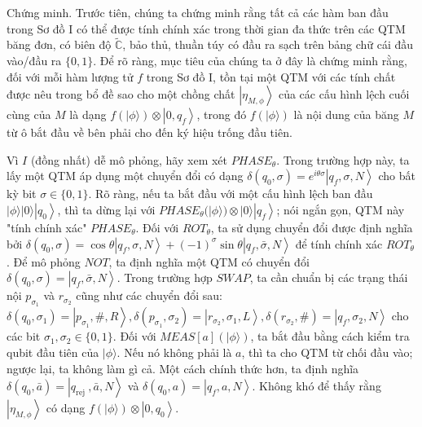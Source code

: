 \documentclass[10pt]{article}
\begin{document}
Chứng minh. Trước tiên, chúng ta chứng minh rằng tất cả các hàm ban đầu trong Sơ đồ I có thể được tính chính xác trong thời gian đa thức trên các QTM băng đơn, có biên độ $\tilde{\mathbb{C}}$, bảo thủ, thuần túy có đầu ra sạch trên bảng chữ cái đầu vào/đầu ra $\{0,1\}$. Để rõ ràng, mục tiêu của chúng ta ở đây là chứng minh rằng, đối với mỗi hàm lượng tử $f$ trong Sơ đồ I, tồn tại một QTM với các tính chất được nêu trong bổ đề sao cho một chồng chất $\left|\eta_{M, \phi}\right\rangle$ của các cấu hình lệch cuối cùng của $M$ là dạng $f(|\phi\rangle) \otimes\left|0, q_{f}\right\rangle$, trong đó $f(|\phi\rangle)$ là nội dung của băng $M$ từ ô bắt đầu về bên phải cho đến ký hiệu trống đầu tiên.

Vì $I$ (đồng nhất) dễ mô phỏng, hãy xem xét $P H A S E_{\theta}$. Trong trường hợp này, ta lấy một QTM áp dụng một chuyển đổi có dạng $\delta\left(q_{0}, \sigma\right)=e^{i \theta \sigma}\left|q_{f}, \sigma, N\right\rangle$ cho bất kỳ bit $\sigma \in\{0,1\}$. Rõ ràng, nếu ta bắt đầu với một cấu hình lệch ban đầu $|\phi\rangle|0\rangle\left|q_{0}\right\rangle$, thì ta dừng lại với $P H A S E_{\theta}(|\phi\rangle) \otimes|0\rangle\left|q_{f}\right\rangle$; nói ngắn gọn, QTM này "tính chính xác" $P H A S E_{\theta}$. Đối với $R O T_{\theta}$, ta sử dụng chuyển đổi được định nghĩa bởi $\delta\left(q_{0}, \sigma\right)=\cos \theta\left|q_{f}, \sigma, N\right\rangle+(-1)^{\sigma} \sin \theta\left|q_{f}, \bar{\sigma}, N\right\rangle$ để tính chính xác $R O T_{\theta}$. Để mô phỏng $N O T$, ta định nghĩa một QTM có chuyển đổi $\delta\left(q_{0}, \sigma\right)=\left|q_{f}, \bar{\sigma}, N\right\rangle$. Trong trường hợp $S W A P$, ta cần chuẩn bị các trạng thái nội $p_{\sigma_{1}}$ và $r_{\sigma_{2}}$ cũng như các chuyển đổi sau: $\delta\left(q_{0}, \sigma_{1}\right)=\left|p_{\sigma_{1}}, \#, R\right\rangle, \delta\left(p_{\sigma_{1}}, \sigma_{2}\right)=\left|r_{\sigma_{2}}, \sigma_{1}, L\right\rangle, \delta\left(r_{\sigma_{2}}, \#\right)=\left|q_{f}, \sigma_{2}, N\right\rangle$ cho các bit $\sigma_{1}, \sigma_{2} \in\{0,1\}$. Đối với $M E A S[a](|\phi\rangle)$, ta bắt đầu bằng cách kiểm tra qubit đầu tiên của $|\phi\rangle$. Nếu nó không phải là $a$, thì ta cho QTM từ chối đầu vào; ngược lại, ta không làm gì cả. Một cách chính thức hơn, ta định nghĩa $\delta\left(q_{0}, \bar{a}\right)=\left|q_{\text {rej }}, \bar{a}, N\right\rangle$ và $\delta\left(q_{0}, a\right)=\left|q_{f}, a, N\right\rangle$. Không khó để thấy rằng $\left|\eta_{M, \phi}\right\rangle$ có dạng $f(|\phi\rangle) \otimes\left|0, q_{0}\right\rangle$.
\end{document}
